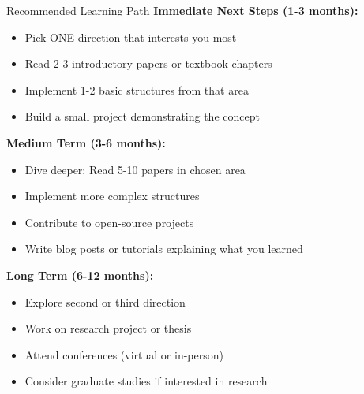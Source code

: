 \documentclass[aspectratio=169,xcolor=dvipsnames]{beamer}
\begin{document}
\begin{frame}{Recommended Learning Path}
  \textbf{Immediate Next Steps (1-3 months):}
  \begin{itemize}
    \item Pick ONE direction that interests you most
    \item Read 2-3 introductory papers or textbook chapters
    \item Implement 1-2 basic structures from that area
    \item Build a small project demonstrating the concept
  \end{itemize}

  \vspace{0.3cm}
  \textbf{Medium Term (3-6 months):}
  \begin{itemize}
    \item Dive deeper: Read 5-10 papers in chosen area
    \item Implement more complex structures
    \item Contribute to open-source projects
    \item Write blog posts or tutorials explaining what you learned
  \end{itemize}

  \vspace{0.3cm}
  \textbf{Long Term (6-12 months):}
  \begin{itemize}
    \item Explore second or third direction
    \item Work on research project or thesis
    \item Attend conferences (virtual or in-person)
    \item Consider graduate studies if interested in research
  \end{itemize}
\end{frame}
\end{document}

